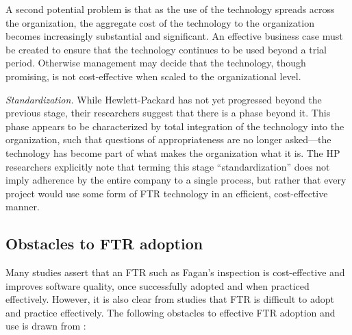 \begin{itemizenoindent}
  A second potential problem is that as the use of the technology spreads
  across the organization, the aggregate cost of the technology to the
  organization becomes increasingly substantial and significant. An
  effective business case must be created to ensure that the technology
  continues to be used beyond a trial period. Otherwise management may
  decide that the technology, though promising, is not cost-effective
  when scaled to the organizational level.

\item {\em Standardization.}  While Hewlett-Packard has not yet progressed beyond the
  previous stage, their researchers suggest that there is a phase beyond
  it.  This phase appears to be characterized by total integration of the
  technology into the organization, such that questions of
  appropriateness are no longer asked---the technology has become part of
  what makes the organization what it is. The HP researchers explicitly
  note that terming this stage ``standardization'' does not imply
  adherence by the entire company to a single process, but rather that
  every project would use some form of FTR technology in an efficient,
  cost-effective manner.

\end{itemizenoindent}

\subsection{Obstacles to FTR adoption}

Many studies assert that an FTR such as Fagan's inspection is
cost-effective and improves software quality, once successfully adopted and
when practiced effectively. However, it is also clear from studies that FTR
is difficult to adopt and practice effectively.  The following obstacles to
effective FTR adoption and use is drawn from
\cite{Basili94,Brykczynski94,Russell91}:








